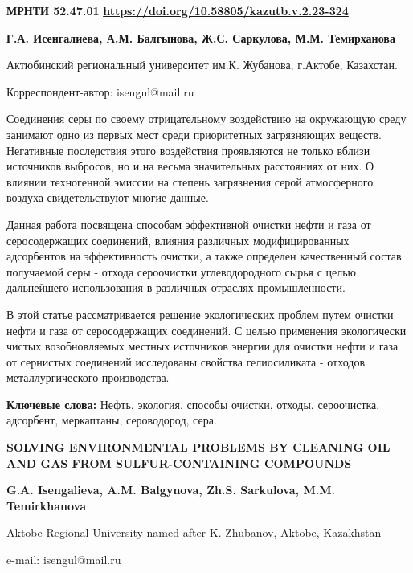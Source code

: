 \newpage
{}
{\bfseries МРНТИ 52.47.01}
\hfill {\bfseries \href{https://doi.org/10.58805/kazutb.v.2.23-324}{https://doi.org/10.58805/kazutb.v.2.23-324}}


\begin{center}
{\bfseries Г.А. Исенгалиева\envelope, А.М. Балгынова, Ж.С. Саркулова, М.М. Темирханова}

Актюбинский региональный университет им.К. Жубанова, г.Актобе,
Казахстан.

\envelope Корреспондент-автор: isengul@mail.ru
\end{center}

Соединения серы по своему отрицательному воздействию на окружающую среду
занимают одно из первых мест среди приоритетных загрязняющих веществ.
Негативные последствия этого воздействия проявляются не только вблизи
источников выбросов, но и на весьма значительных расстояниях от них. О
влиянии техногенной эмиссии на степень загрязнения серой атмосферного
воздуха свидетельствуют многие данные.

Данная работа посвящена способам эффективной очистки нефти и газа от
серосодержащих соединений, влияния различных модифицированных
адсорбентов на эффективность очистки, а также определен качественный
состав получаемой серы - отхода сероочистки углеводородного сырья с
целью дальнейшего использования в различных отраслях промышленности.

В этой статье рассматривается решение экологических проблем путем
очистки нефти и газа от серосодержащих соединений. С целью применения
экологически чистых возобновляемых местных источников энергии для
очистки нефти и газа от сернистых соединений исследованы свойства
гелиосиликата - отходов металлургического производства.

{\bfseries Ключевые слова:} Нефть, экология, способы очистки, отходы,
сероочистка, адсорбент, меркаптаны, сероводород, сера.

\begin{center}
{\large\bfseries SOLVING ENVIRONMENTAL PROBLEMS BY CLEANING OIL AND GAS FROM SULFUR-CONTAINING COMPOUNDS}

{\bfseries G.A. Isengalieva\envelope, A.M. Balgynova, Zh.S. Sarkulova, M.M. Temirkhanova}

Aktobe Regional University named after K. Zhubanov, Aktobe, Kazakhstan

e-mail: isengul@mail.ru
\end{center}

